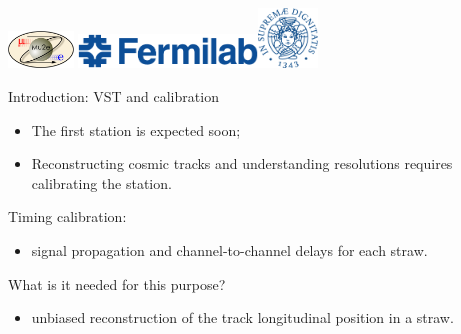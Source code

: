 \documentclass{beamer}[10pt]
\begin{document}
\begin{frame}
\centering
\includegraphics[height=1cm]{figures/png/mu2e_logo_oval.png}
\titlepage
\centering
\includegraphics[height=0.9cm]{figures/png/FNAL-Logo-NAL-Blue.png}\hspace{10mm}\includegraphics[height=1.6cm]{figures/pdf/cherubino.pdf}

\end{frame}
\begin{frame}{Introduction: VST and calibration}
  \begin{itemize}
  \item The first station is expected soon;
  \vspace{1mm}
  \item Reconstructing cosmic tracks and understanding resolutions requires calibrating the station.
  \end{itemize}
  \vspace{3mm}
 Timing calibration:
 \vspace{1mm}
  \begin{itemize}
    \item signal propagation and channel-to-channel delays for each straw.
  \end{itemize}
  \vspace{3mm}
  What is it needed for this purpose?
  \vspace{1mm}
  \begin{itemize}
    \item unbiased reconstruction of the track longitudinal position in a straw.
  \end{itemize}
 
\end{frame}
\end{document}
